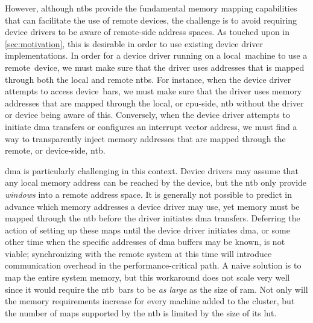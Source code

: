 However, although \glspl{ntb} provide the fundamental memory mapping capabilities that can facilitate the use of remote devices, the challenge is to avoid requiring device drivers to be aware of remote-side address spaces.
%
As touched upon in \cref{sec:motivation}, this is desirable in order to use existing device driver implementations.
%
In order for a device driver running on a local~machine to use a remote~device, we must make sure that the driver uses addresses that is mapped through both the local and remote \glspl{ntb}.
%
For instance, when the device driver attempts to access device~\glspl{bar}, we must make sure that the driver uses memory addresses that are mapped through the local, or \gls{cpu}-side, \gls{ntb} without the driver or device being aware of this.
%
Conversely, when the device driver attempts to initiate \gls{dma} transfers or configures an interrupt vector address, we must find a way to transparently inject memory addresses that are mapped through the remote, or device-side, \gls{ntb}.



\Gls{dma} is particularly challenging in this context.
%
Device drivers may assume that any local memory address can be reached by the device, but the \gls{ntb} only provide \emph{windows} into a remote address space.
%
It is generally not possible to predict in advance which memory addresses a device driver may use, yet memory must be mapped through the \gls{ntb} before the driver initiates \gls{dma} transfers.
%
Deferring the action of setting up these maps until the device driver initiates \gls{dma}, or some other time when the specific addresses of \gls{dma} buffers may be known, is not viable;
%
synchronizing with the remote system at this time will introduce communication overhead in the performance-critical path.
%
A naive solution is to map the entire system memory, but this workaround does not scale very well since it would require the \gls{ntb}~\glspl{bar} to be \emph{as large} as the size of \gls{ram}.
%
Not only will the memory requirements increase for every machine added to the cluster, but the number of maps supported by the \gls{ntb} is limited by the size of its \gls{lut}.




